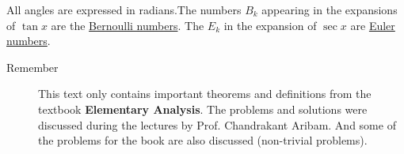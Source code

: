 \documentclass{notes}
\begin{document}
\begin{description}
All angles are expressed in radians.The numbers $B_k$
appearing in the expansions of $\tan x$ are the
\href{https://en.wikipedia.org/wiki/Bernoulli_number}{Bernoulli numbers}. The $E_k$ in the expansion  of $\sec x$ are
\href{https://en.wikipedia.org/wiki/Euler_number}{Euler numbers}. 
\end{description}


\begin{description}
	\item[Remember] This text only contains important theorems and definitions from the textbook \textbf{Elementary Analysis}. The problems and solutions were discussed during the lectures by  Prof. Chandrakant Aribam. 
	And some of the problems for the book are also discussed (non-trivial problems). 
\end{description}




\end{document}

